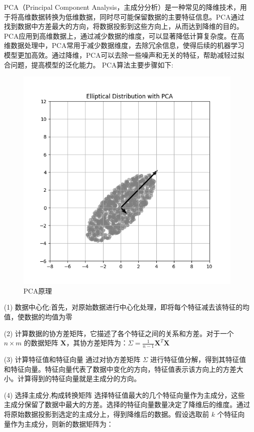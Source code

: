 PCA（Principal Component Analysis，主成分分析）是一种常见的降维技术，用于将高维数据转换为低维数据，同时尽可能保留数据的主要特征信息。PCA通过找到数据中方差最大的方向，将数据投影到这些方向上，从而达到降维的目的。PCA应用到高维数据上，通过减少数据的维度，可以显著降低计算复杂度。在高维数据处理中，PCA常用于减少数据维度，去除冗余信息，使得后续的机器学习模型更加高效。通过降维，PCA可以去除一些噪声和无关的特征，帮助减轻过拟合问题，提高模型的泛化能力。 PCA算法主要步骤如下\cite{jolliffe1986principal}:
\begin{figure}[h]
    \centering
    \includegraphics[width=1.\linewidth]{assets/pca.png}
    \caption{PCA原理}
    \label{tag:pca}
\end{figure}

 (1) 数据中心化:首先，对原始数据进行中心化处理，即将每个特征减去该特征的均值，使数据的均值为零

 (2) 计算数据的协方差矩阵，它描述了各个特征之间的关系和方差。对于一个 \(n \times m\) 的数据矩阵 \(\mathbf{X}\)，其协方差矩阵为：$\Sigma = \frac{1}{n-1} \mathbf{X}^T \mathbf{X}$


(3) 计算特征值和特征向量
通过对协方差矩阵 \(\Sigma\) 进行特征值分解，得到其特征值和特征向量。特征向量代表了数据中变化的方向，特征值表示该方向上的方差大小。计算得到的特征向量就是主成分的方向。


(4) 选择主成分,构成转换矩阵
选择特征值最大的几个特征向量作为主成分，这些主成分保留了数据中最大的方差。选择的特征向量数量决定了降维后的维度。通过将原始数据投影到选定的主成分上，得到降维后的数据。假设选取前 \(k\) 个特征向量作为主成分，则新的数据矩阵为：

